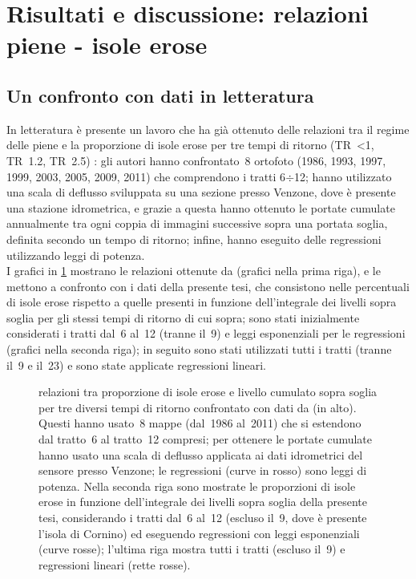 \section[Risultati e discussione: relazioni piene - isole erose]{Risultati e discussione: relazioni\\piene - isole erose}
\subsection{Un confronto con dati in letteratura}
In letteratura è presente un lavoro che ha già ottenuto delle relazioni tra il regime delle piene e la proporzione di isole erose per tre tempi di ritorno (TR~\SI{<1}{\anno}, TR~\SI{1.2}{\anni}, TR~\SI{2.5}{\anni}) :
gli autori hanno confrontato~8 ortofoto (1986, 1993, 1997, 1999, 2003, 2005, 2009, 2011) che comprendono i tratti 6$\div$12;
hanno utilizzato una scala di deflusso sviluppata su una sezione presso Venzone, dove è presente una stazione idrometrica, e grazie a questa hanno ottenuto le portate cumulate annualmente tra ogni coppia di immagini successive sopra una portata soglia, definita secondo un tempo di ritorno;
infine, hanno eseguito delle regressioni utilizzando leggi di potenza.
\\
I grafici in \cref{graph:relazioni-piene-erosione-vs-surian} mostrano le relazioni ottenute da  (grafici nella prima riga), e le mettono a confronto con i dati della presente tesi, che consistono nelle percentuali di isole erose rispetto a quelle presenti in funzione dell'integrale dei livelli sopra soglia per gli stessi tempi di ritorno di cui sopra; sono stati inizialmente considerati i tratti dal~6 al~12 (tranne il~9) e leggi esponenziali per le regressioni (grafici nella seconda riga); in seguito sono stati utilizzati tutti i tratti (tranne il~9 e il~23) e sono state applicate regressioni lineari.
%
\begin{figure}
	\centering
	
	\caption[relazioni tra proporzione di isole erose e livello cumulato sopra soglia, confrontato con dati da ]{relazioni tra proporzione di isole erose e livello cumulato sopra soglia per tre diversi tempi di ritorno confrontato con dati da  (in alto).
	Questi hanno usato~8 mappe (dal~1986 al~2011) che si estendono dal tratto~6 al tratto~12 compresi; per ottenere le portate cumulate hanno usato una scala di deflusso applicata ai dati idrometrici del sensore presso Venzone; le regressioni (curve in rosso) sono leggi di potenza.
	Nella seconda riga sono mostrate le proporzioni di isole erose in funzione dell'integrale dei livelli sopra soglia della presente tesi, considerando i tratti dal~6 al~12 (escluso il~9, dove è presente l'isola di Cornino) ed eseguendo regressioni con leggi esponenziali (curve rosse); l'ultima riga mostra tutti i tratti (escluso il~9) e regressioni lineari (rette rosse).}
	\label{graph:relazioni-piene-erosione-vs-surian}
\end{figure}
